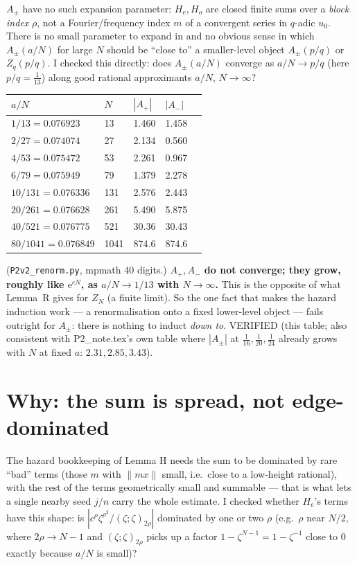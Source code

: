 \documentclass[11pt]{article}
\theoremstyle{remark}\newtheorem{remark}[theorem]{Remark}
\newcommand{\e}{\mathrm{e}}
\begin{document}
$A_\pm$ have no such expansion parameter: $H_e,H_o$ are closed finite sums over a \emph{block index} $\rho$, not a Fourier/frequency
index $m$ of a convergent series in $q$-adic $u_0$. There is no small parameter to expand in and no obvious sense in which
$A_\pm(a/N)$ for large $N$ should be ``close to'' a smaller-level object $A_\pm(p/q)$ or $Z_q(p/q)$. I checked this directly:
does $A_\pm(a/N)$ converge as $a/N\to p/q$ (here $p/q=\frac1{13}$) along good rational approximants $a/N$, $N\to\infty$?

\begin{center}\small
\begin{tabular}{lllll}\toprule
$a/N$ & $N$ & $|A_+|$ & $|A_-|$ \\\midrule
$1/13=0.076923$ & 13 & 1.460 & 1.458\\
$2/27=0.074074$ & 27 & 2.134 & 0.560\\
$4/53=0.075472$ & 53 & 2.261 & 0.967\\
$6/79=0.075949$ & 79 & 1.379 & 2.278\\
$10/131=0.076336$ & 131 & 2.576 & 2.443\\
$20/261=0.076628$ & 261 & 5.490 & 5.875\\
$40/521=0.076775$ & 521 & 30.36 & 30.43\\
$80/1041=0.076849$ & 1041 & 874.6 & 874.6\\\bottomrule
\end{tabular}\end{center}

(\texttt{P2v2\_renorm.py}, mpmath 40 digits.) \textbf{$A_+,A_-$ do not converge; they grow, roughly like $\e^{cN}$, as $a/N\to1/13$
with $N\to\infty$.} This is the opposite of what Lemma~R gives for $Z_N$ (a finite limit). So the one fact that makes the hazard
induction work --- a renormalisation onto a fixed lower-level object --- fails outright for $A_\pm$: there is nothing to induct
\emph{down to}. VERIFIED (this table; also consistent with P2\_note.tex's own table where $|A_\pm|$ at $\frac1{16},\frac1{20},\frac1{24}$
already grows with $N$ at fixed $a$: $2.31,2.85,3.43$).

\section{Why: the sum is spread, not edge-dominated}
The hazard bookkeeping of Lemma H needs the sum to be dominated by rare ``bad'' terms (those $m$ with $\|mx\|$ small, i.e.\ close
to a low-height rational), with the rest of the terms geometrically small and summable --- that is what lets a single nearby seed
$j/n$ carry the whole estimate. I checked whether $H_e$'s terms have this shape: is $|c^\rho\zeta^{\rho^2}/(\zeta;\zeta)_{2\rho}|$
dominated by one or two $\rho$ (e.g.\ $\rho$ near $N/2$, where $2\rho\to N-1$ and $(\zeta;\zeta)_{2\rho}$ picks up a factor
$1-\zeta^{N-1}=1-\zeta^{-1}$ close to $0$ exactly because $a/N$ is small)?
\end{document}
